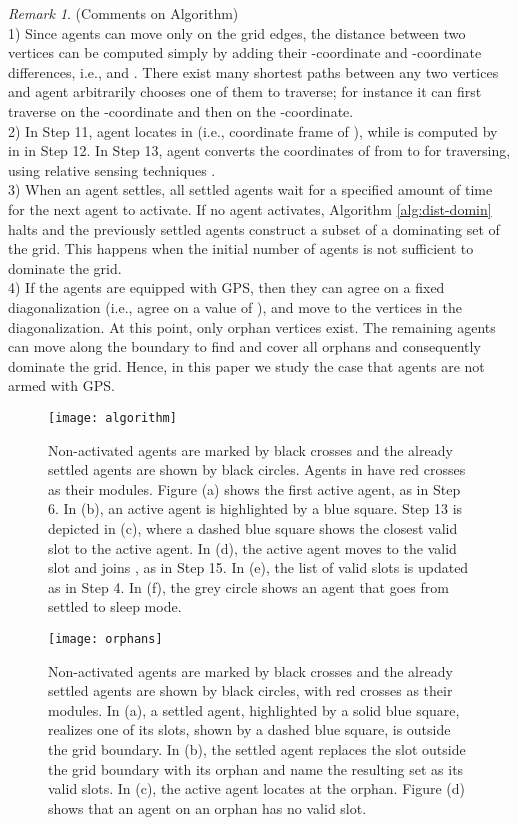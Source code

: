 \documentclass[letterpaper, 10pt, conference]{ieeeconf}
\theoremstyle{definition}
\theoremstyle{remark}
\newtheorem{remark}[theorem]{Remark}
\begin{document}
\begin{remark}(Comments on Algorithm)\\
1) Since agents can move only on the grid edges, the distance
  between two vertices can be computed simply by adding their
  -coordinate and -coordinate differences, i.e.,  and
  . There exist many shortest paths between any two vertices
  and agent  arbitrarily chooses one of them to traverse; for
  instance it can first traverse on the -coordinate and then on the
  -coordinate. \\
2) In Step 11, agent  locates  in  (i.e., coordinate frame of ), while  is computed by  in
   in Step 12. In Step 13, agent  converts the coordinates
  of  from  to  for
  traversing, using relative sensing techniques
  \cite{PSFBA'08}. \\
3) When an agent settles, all settled agents wait for a specified amount of time for the next agent to activate. If no agent activates, Algorithm \ref{alg:dist-domin} halts and the previously settled agents construct a subset of a dominating set of the grid. This happens when the initial number of agents is not sufficient to dominate the grid.\\
4) If the agents are equipped with GPS, then they can agree on a fixed diagonalization (i.e., agree on a value of ), and move to the vertices  in the diagonalization.  At this point, only orphan vertices exist. The remaining agents can move along the boundary to find and cover all orphans and consequently dominate the grid. Hence, in this paper we study the case that agents are not armed with GPS.
\end{remark}


\begin{figure}[t]
\texttt{[image: algorithm]}
\vspace{-1cm}
\caption{Non-activated agents are marked by black crosses and the already settled agents are shown by black circles. Agents in  have red crosses as their modules. Figure (a) shows the first active agent, as in Step 6. In (b), an active agent is highlighted by a blue square. Step 13 is depicted in (c), where a dashed blue square shows the closest valid slot to the active agent. In (d), the active agent moves to the valid slot and joins , as in Step 15. In (e), the list of valid slots is updated as in Step 4. In (f), the grey circle shows an agent that goes from settled to sleep mode.}
\label{fig:steps}
\end{figure}


\begin{figure}[t]
\texttt{[image: orphans]}
\vspace{0cm}
\caption{Non-activated agents are marked by black crosses and the already settled agents are shown by black circles, with red crosses as their modules. In (a), a settled agent, highlighted by a solid blue square, realizes one of its slots, shown by a dashed blue square, is outside the grid boundary. In (b), the settled agent replaces the slot outside the grid boundary with its orphan and name the resulting set as its valid slots. In (c), the active agent locates at the orphan. Figure (d) shows that an agent on an orphan has no valid slot.}
\label{fig:orphans}
\end{figure}
\end{document}
